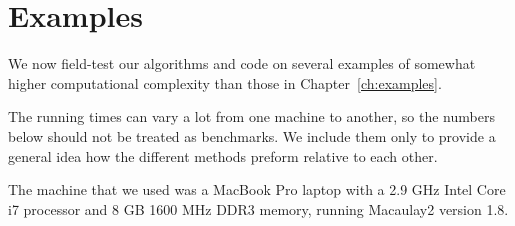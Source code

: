 \documentclass[fleqn,reqno]{amsart}
\numberwithin{first}{chapter}
\begin{document}
\section{Examples}
\label{sec:long-examples}

\begin{paragraf*}
We now field-test our algorithms and code on several examples of
somewhat higher computational complexity than those in Chapter~\ref{ch:examples}.

The running times can vary a lot from one machine to another,
so the numbers below should not be treated as benchmarks.
We include them only to provide a general idea how the different methods preform
relative to each other.

The machine that we used was a MacBook Pro laptop with
a 2.9 GHz Intel Core i7 processor and 8 GB 1600 MHz DDR3 memory,
running Macaulay2 version 1.8.
\end{paragraf*}
\end{document}
